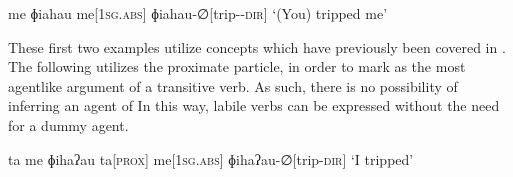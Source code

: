 \ex
\begingl
\glpreamble me ɸiahau
\endpreamble
me[\textsc{1sg.abs}]
ɸiahau-∅[trip-\textsc{-dir}]
\glft `(You) tripped me'
\endgl
\xe

These first two examples utilize concepts which have previously been covered in . The following utilizes the proximate particle,  in order to mark  as the most agentlike argument of a transitive verb. As such, there is no possibility of inferring an agent of  In this way, labile verbs can be expressed without the need for a dummy agent.

\ex
\begingl
\glpreamble ta me ɸihaʔau
\endpreamble
ta[\textsc{prox}]
me[\textsc{1sg.abs}]
ɸihaʔau-∅[trip\textsc{-dir}]
\glft `I tripped'
\endgl
\xe

